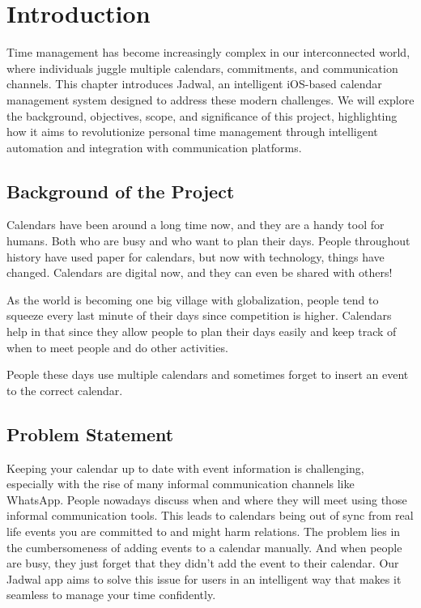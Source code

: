 \chapter{Introduction}

Time management has become increasingly complex in our interconnected world, where individuals juggle multiple calendars, commitments, and communication channels. This chapter introduces Jadwal, an intelligent iOS-based calendar management system designed to address these modern challenges. We will explore the background, objectives, scope, and significance of this project, highlighting how it aims to revolutionize personal time management through intelligent automation and integration with communication platforms.


\section{Background of the Project}

Calendars have been around a long time now, and they are a handy tool for humans. Both who are busy and who want to plan their days. People throughout history have used paper for calendars, but now with technology, things have changed. Calendars are digital now, and they can even be shared with others!

As the world is becoming one big village with globalization, people tend to squeeze every last minute of their days since competition is higher. Calendars help in that since they allow people to plan their days easily and keep track of when to meet people and do other activities.

People these days use multiple calendars and sometimes forget to insert an event to the correct calendar.

\section{Problem Statement}

Keeping your calendar up to date with event information is challenging, especially with the rise of many informal communication channels like WhatsApp. People nowadays discuss when and where they will meet using those informal communication tools. This leads to calendars being out of sync from real life events you are committed to and might harm relations. The problem lies in the cumbersomeness of adding events to a calendar manually. And when people are busy, they just forget that they didn't add the event to their calendar. Our Jadwal app aims to solve this issue for users in an intelligent way that makes it seamless to manage your time confidently.

